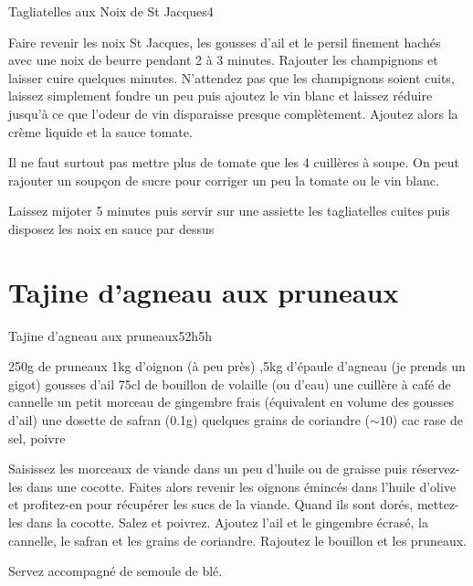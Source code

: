 {\begin{recette}{Tagliatelles aux Noix de St Jacques}{4}{}{}
\begin{preparation}
\etape Faire revenir les noix St Jacques, les gousses d'ail et le persil finement hachés avec une noix de beurre pendant 2 à 3 
minutes.
\etape Rajouter les champignons et laisser cuire quelques minutes. N'attendez pas que les champignons soient cuits, laissez 
simplement fondre un peu puis ajoutez le vin blanc et laissez réduire jusqu'à ce que l'odeur de vin disparaisse presque 
complètement.
\etape Ajoutez alors la crème liquide et la sauce tomate.
\begin{remarque}
Il ne faut surtout pas mettre plus de tomate que les 4 cuillères à soupe. On peut rajouter un soupçon de sucre pour corriger un 
peu la tomate ou le vin blanc.
\end{remarque}
\etape Laissez mijoter 5 minutes puis servir sur une assiette les tagliatelles cuites puis disposez les noix en sauce par dessus
\end{preparation}
\end{recette}

\section{Tajine d'agneau aux pruneaux}
\begin{recette}{Tajine d'agneau aux pruneaux}{5}{2h}{5h}
\begin{ingredients}
\ingredient 250g de pruneaux
\ingredient 1kg d’oignon (à peu près)
,5kg d’épaule d’agneau (je prends un gigot)
 gousses d'ail
\ingredient 75cl de bouillon de volaille (ou d'eau)
\ingredient une cuillère à café de cannelle
\ingredient un petit morceau de gingembre frais (équivalent en volume des gousses d'ail)
\ingredient une dosette de safran (0.1g)
\ingredient quelques grains de coriandre ($\sim 10$)
 cac rase de sel, poivre
\end{ingredients}

\begin{preparation}
\etape Saisissez les morceaux de viande dans un peu d'huile ou de graisse puis réservez-les dans une cocotte. 
\etape Faites alors revenir les oignons émincés dans l'huile d'olive et profitez-en pour récupérer les sucs de la viande. 
Quand ils sont dorés, mettez-les dans la cocotte.
\etape Salez et poivrez. Ajoutez l'ail et le gingembre écrasé, 
la cannelle, le safran et les grains de coriandre.
\etape Rajoutez le bouillon  et les pruneaux.
\begin{remarque}
Servez accompagné de semoule de blé.
\end{remarque}
\end{preparation}


\end{recette}}
